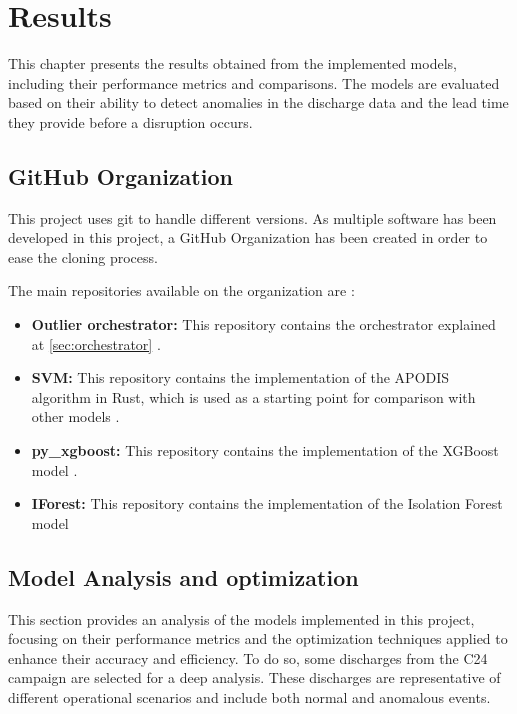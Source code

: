 \chapter{Results}\label{sec:cap4}

This chapter presents the results obtained from the implemented models, including their performance metrics and comparisons. The models are evaluated based on their ability to detect anomalies in the discharge data and the lead time they provide before a disruption occurs.

\section{GitHub Organization}

This project uses git to handle different versions. As multiple software has been developed in this project, a GitHub Organization has been created in order to ease the cloning process.

The main repositories available on the organization are \autocite{OutlierClassifier}:

\begin{itemize}
    \item \textbf{Outlier orchestrator:} This repository contains the orchestrator explained at \autoref{sec:orchestrator} \autocite{OutlierClassifierOutlier_orchestrator2025a}.
    \item \textbf{SVM:} This repository contains the implementation of the \ac{APODIS} algorithm in Rust, which is used as a starting point for comparison with other models \autocite{OutlierClassifierSvm2025}.
    \item \textbf{py\_xgboost:} This repository contains the implementation of the XGBoost model \autocite{OutlierClassifierPy_xgboost2025}.
    \item \textbf{IForest:} This repository contains the implementation of the Isolation Forest model \autocite{OutlierClassifierPy_iforestPython}
\end{itemize}

\section{Model Analysis and optimization}

This section provides an analysis of the models implemented in this project, focusing on their performance metrics and the optimization techniques applied to enhance their accuracy and efficiency. To do so, some discharges from the C24 campaign are selected for a deep analysis. These discharges are representative of different operational scenarios and include both normal and anomalous events.

